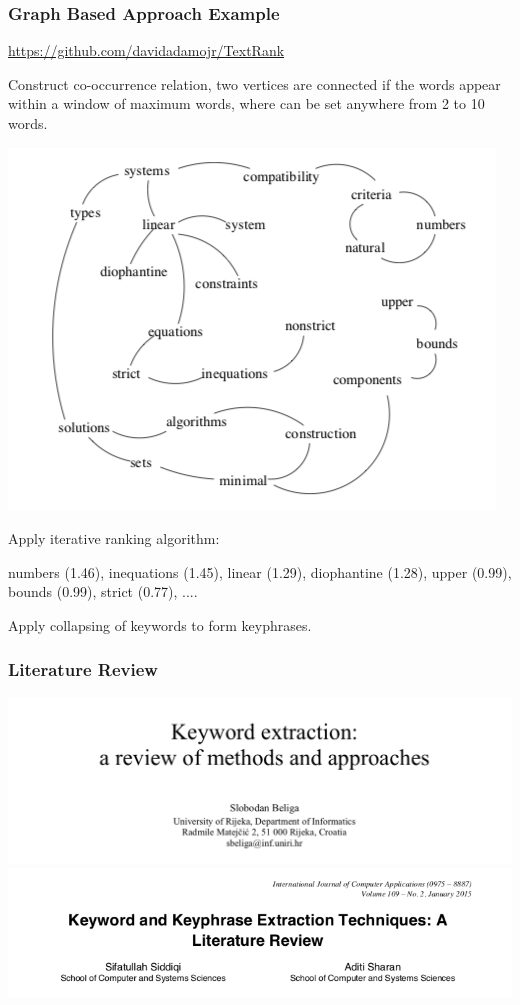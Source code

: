 \documentclass{beamer}
\begin{document}
\begin{frame}
\frametitle{Graph Based Approach Example}

\url{https://github.com/davidadamojr/TextRank}

\vspace{0.1in}

Construct co-occurrence relation, two vertices are connected if the words appear within a window of maximum words, where can be set anywhere from 2 to 10 words.
\begin{center}
\includegraphics[scale = 0.3]{img/graph}
\end{center}
Apply iterative ranking algorithm:

numbers (1.46), inequations (1.45), linear (1.29), diophantine (1.28), upper (0.99), bounds (0.99), strict (0.77), ....

\vspace{0.1in}
Apply collapsing of keywords to form keyphrases.
\end{frame}


\begin{frame}
\frametitle{Literature Review}
\includegraphics[width= 1\textwidth]{img/lit_review}
\vspace{0.2in}
\includegraphics[width= 1\textwidth]{img/lit_review2}
\end{frame}
\end{document}
